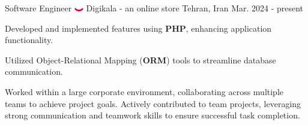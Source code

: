 

\begin{cventries}
  \cventry
    {Software Engineer} %
    {\includegraphics[width=0.03\textwidth]{images/digikala.png} Digikala - \textnormal{an online store}} %
    {Tehran, Iran} %
    {Mar. 2024 - present} %
    {
      \begin{cvitems} %
        \item Developed and implemented features using \textbf{PHP}, enhancing application functionality.
        \item Utilized Object-Relational Mapping (\textbf{ORM}) tools to streamline database communication.
        \item Worked within a large corporate environment, collaborating across multiple teams to achieve project goals. Actively contributed to team projects, leveraging strong communication and teamwork skills to ensure successful task completion.
      \end{cvitems}
    }


\end{cventries}
